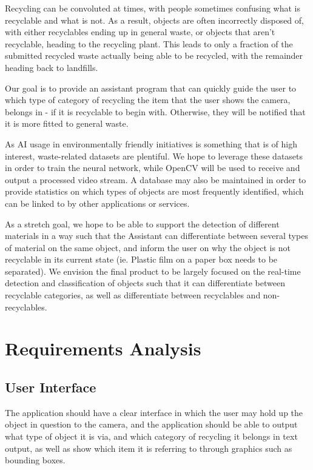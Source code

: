 \documentclass[conference]{IEEEtran}
\begin{document}
Recycling can be convoluted at times, with people sometimes confusing what is recyclable and what is not. As a result, objects are often incorrectly disposed of, with either recyclables ending up in general waste, or objects that aren't recyclable, heading to the recycling plant. This leads to only a fraction of the submitted recycled waste actually being able to be recycled, with the remainder heading back to landfills. 

Our goal is to provide an assistant program that can quickly guide the user to which type of category of recycling the item that the user shows the camera, belongs in - if it is recyclable to begin with. Otherwise, they will be notified that it is more fitted to general waste.

As AI usage in environmentally friendly initiatives is something that is of high interest, waste-related datasets are plentiful. We hope to leverage these datasets in order to train the neural network, while OpenCV will be used to receive and output a processed video stream. A database may also be maintained in order to provide statistics on which types of objects are most frequently identified, which can be linked to by other applications or services. 

As a stretch goal, we hope to be able to support the detection of different materials in a way such that the Assistant can differentiate between several types of material on the same object, and inform the user on why the object is not recyclable in its current state (ie. Plastic film on a paper box needs to be separated).
We envision the final product to be largely focused on the real-time detection and classification of objects such that it can differentiate between recyclable categories, as well as differentiate between recyclables and non-recyclables.


\section{Requirements Analysis}

\subsection{User Interface}

The application should have a clear interface in which the user may hold up the object in question to the camera, and the application should be able to output what type of object it is via, and which category of recycling it belongs in text output, as well as show which item it is referring to through graphics such as bounding boxes.
\end{document}
